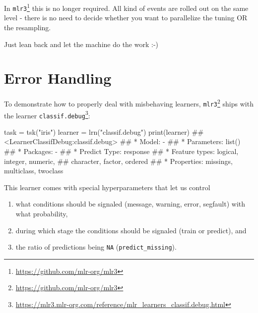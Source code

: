 \documentclass[12pt,]{scrbook}
\newenvironment{Shaded}{}{}
\newcommand{\KeywordTok}[1]{\textcolor[rgb]{0.00,0.00,1.00}{#1}}
\newcommand{\NormalTok}[1]{#1}
\newcommand{\StringTok}[1]{\textcolor[rgb]{0.00,0.50,0.50}{#1}}
\providecommand{\tightlist}{%
  \setlength{\itemsep}{0pt}\setlength{\parskip}{0pt}}
\renewcommand{\href}[2]{#2\footnote{\url{#1}}}
\begin{document}
In \href{https://github.com/mlr-org/mlr3}{\texttt{mlr3}} this is no longer required.
All kind of events are rolled out on the same level - there is no need to decide whether you want to parallelize the tuning OR the resampling.

Just lean back and let the machine do the work :-)

\hypertarget{error-handling}{%
\section{Error Handling}\label{error-handling}}

To demonstrate how to properly deal with misbehaving learners, \href{https://github.com/mlr-org/mlr3}{\texttt{mlr3}} ships with the learner \href{https://mlr3.mlr-org.com/reference/mlr_learners_classif.debug.html}{\texttt{classif.debug}}:

\begin{Shaded}
\begin{Highlighting}[]
\NormalTok{task =}\StringTok{ }\KeywordTok{tsk}\NormalTok{(}\StringTok{"iris"}\NormalTok{)}
\NormalTok{learner =}\StringTok{ }\KeywordTok{lrn}\NormalTok{(}\StringTok{"classif.debug"}\NormalTok{)}
\KeywordTok{print}\NormalTok{(learner)}
\NormalTok{## <LearnerClassifDebug:classif.debug>}
\NormalTok{## * Model: -}
\NormalTok{## * Parameters: list()}
\NormalTok{## * Packages: -}
\NormalTok{## * Predict Type: response}
\NormalTok{## * Feature types: logical, integer, numeric,}
\NormalTok{##   character, factor, ordered}
\NormalTok{## * Properties: missings, multiclass, twoclass}
\end{Highlighting}
\end{Shaded}

This learner comes with special hyperparameters that let us control

\begin{enumerate}
\def\labelenumi{\arabic{enumi}.}
\tightlist
\item
  what conditions should be signaled (message, warning, error, segfault) with what probability,
\item
  during which stage the conditions should be signaled (train or predict), and
\item
  the ratio of predictions being \texttt{NA} (\texttt{predict\_missing}).
\end{enumerate}
\end{document}
